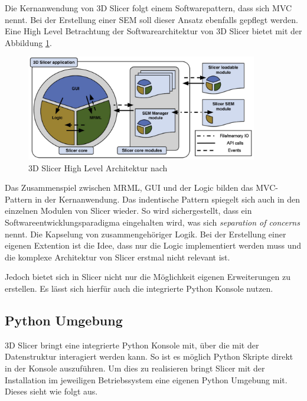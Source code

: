 Die Kernanwendung von 3D Slicer folgt einem Softwarepattern, dass sich \ac{MVC} nennt.
Bei der Erstellung einer \ac{SEM} soll dieser Ansatz ebenfalls gepflegt werden.
Eine High Level Betrachtung der Softwarearchitektur von 3D Slicer bietet
\cite[Seite 1332]{fedorov2012slicer} mit der Abbildung
\ref{fig:3d_slicer_architektur}.

\begin{figure}[h]
	\centering
	\includegraphics[width=0.9\textwidth]{img/3d_slicer_architektur.jpg}
	\caption{3D Slicer High Level Architektur nach \citet[Seite 1326]{fedorov2012slicer}}
	\label{fig:3d_slicer_architektur}
\end{figure}

Das Zusammenspiel zwischen \ac{MRML}, \ac{GUI} und der Logic bilden das MVC-Pattern
in der Kernanwendung. Das indentische Pattern spiegelt sich auch in den einzelnen
Modulen von Slicer wieder. So wird sichergestellt, dass ein Softwareentwicklungsparadigma
eingehalten wird, was sich \textit{separation of concerns} nennt. Die Kapselung
von zusammengehöriger Logik. Bei der Erstellung einer eigenen Extention ist die Idee,
dass nur die Logic implementiert werden muss und die komplexe Architektur von
Slicer erstmal nicht relevant ist.

Jedoch bietet sich in Slicer nicht nur die Möglichkeit eigenen Erweiterungen zu
erstellen. Es lässt sich hierfür auch die integrierte Python Konsole nutzen.

\subsection{Python Umgebung}
\label{subsec:pythob_umgebung} 3D Slicer bringt eine integrierte Python Konsole mit,
über die mit der Datenstruktur interagiert werden kann. So ist es möglich Python
Skripte direkt in der Konsole auszuführen. Um dies zu realisieren bringt Slicer
mit der Installation im jeweiligen Betriebssystem eine eigenen Python Umgebung
mit. Dieses sieht wie folgt aus.

